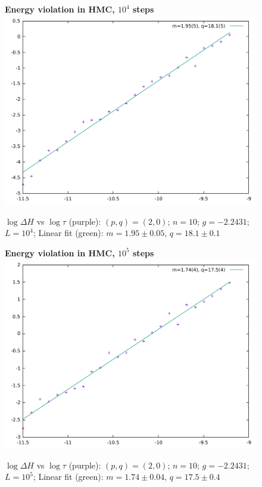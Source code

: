 \documentclass[12pt,a4paper]{article}
\begin{document}
\newpage

\begin{figure}[hp]
\centering
\textbf{Energy violation in HMC, $10^4$ steps}
\includegraphics[width=1\linewidth]{quadratic104.pdf}
\caption{$\log \Delta H$ vs $\log \tau$ (purple): $(p,q)=(2,0)$; $n=10$; $g=-2.2431$; $L=10^4$; Linear fit (green): $m=1.95 \pm 0.05$, $q = 18.1 \pm 0.1$}
\end{figure}

\newpage

\begin{figure}[hp]
\centering
\textbf{Energy violation in HMC, $10^5$ steps}
\includegraphics[width=1\linewidth]{quadratic105.pdf}
\caption{$\log \Delta H$ vs $\log \tau$ (purple): $(p,q)=(2,0)$; $n=10$; $g=-2.2431$; $L=10^5$; Linear fit (green): $m=1.74 \pm 0.04$, $q = 17.5 \pm 0.4$}
\end{figure}
\end{document}

